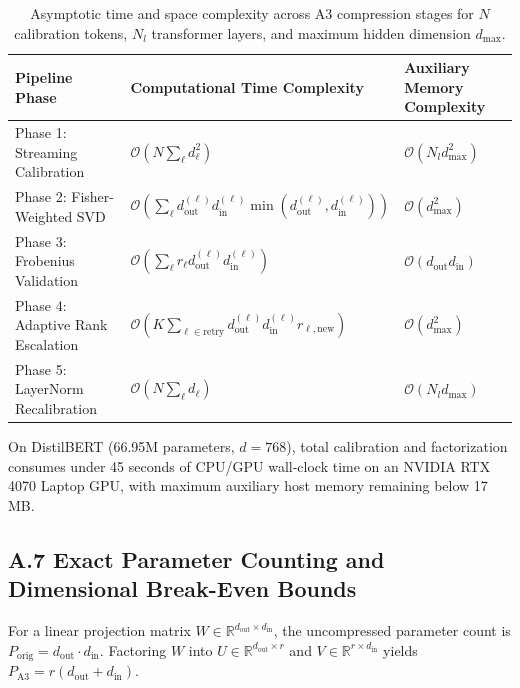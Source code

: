 \begin{table}[H]
\centering
\small
\begin{tabular}{lll}
\toprule
\textbf{Pipeline Phase} & \textbf{Computational Time Complexity} & \textbf{Auxiliary Memory Complexity} \\
\midrule
Phase 1: Streaming Calibration & $\mathcal{O}(N \sum_\ell d_\ell^2)$ & $\mathcal{O}(N_l d_\text{max}^2)$ \\
Phase 2: Fisher-Weighted SVD & $\mathcal{O}(\sum_\ell d_\text{out}^{(\ell)} d_\text{in}^{(\ell)} \min(d_\text{out}^{(\ell)}, d_\text{in}^{(\ell)}))$ & $\mathcal{O}(d_\text{max}^2)$ \\
Phase 3: Frobenius Validation & $\mathcal{O}(\sum_\ell r_\ell d_\text{out}^{(\ell)} d_\text{in}^{(\ell)})$ & $\mathcal{O}(d_\text{out} d_\text{in})$ \\
Phase 4: Adaptive Rank Escalation & $\mathcal{O}(K \sum_{\ell \in \text{retry}} d_\text{out}^{(\ell)} d_\text{in}^{(\ell)} r_{\ell,\text{new}})$ & $\mathcal{O}(d_\text{max}^2)$ \\
Phase 5: LayerNorm Recalibration & $\mathcal{O}(N \sum_\ell d_\ell)$ & $\mathcal{O}(N_l d_\text{max})$ \\
\bottomrule
\end{tabular}
\caption{Asymptotic time and space complexity across A3 compression stages for $N$ calibration tokens, $N_l$ transformer layers, and maximum hidden dimension $d_\text{max}$.}
\label{tab:complexity_analysis}
\end{table}

On DistilBERT (66.95M parameters, $d=768$), total calibration and factorization consumes under 45 seconds of CPU/GPU wall-clock time on an NVIDIA RTX 4070 Laptop GPU, with maximum auxiliary host memory remaining below 17 MB.

\subsection{A.7 Exact Parameter Counting and Dimensional Break-Even Bounds}
\label{sec:app_parameter_counting}

For a linear projection matrix $W \in \mathbb{R}^{d_\text{out} \times d_\text{in}}$, the uncompressed parameter count is $P_\text{orig} = d_\text{out} \cdot d_\text{in}$. Factoring $W$ into $U \in \mathbb{R}^{d_\text{out} \times r}$ and $V \in \mathbb{R}^{r \times d_\text{in}}$ yields $P_\text{A3} = r(d_\text{out} + d_\text{in})$.


